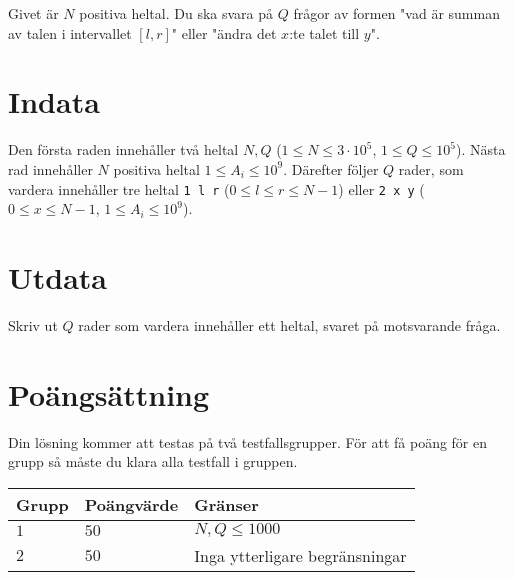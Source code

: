 Givet är $N$ positiva heltal. Du ska svara på $Q$ frågor av formen "vad är summan av talen i intervallet $[l,r]$" eller "ändra det $x$:te talet till $y$".

\section*{Indata}
Den första raden innehåller två heltal $N, Q$ ($1 \leq N \leq 3 \cdot 10^5$, $1 \leq Q \leq 10^5$).
Nästa rad innehåller $N$ positiva heltal $1 \leq A_i \leq 10^9$.
Därefter följer $Q$ rader, som vardera innehåller tre heltal \texttt{1 l r} ($0 \leq l \leq r \leq N-1$) eller \texttt{2 x y} ($0 \leq x \leq N-1$, $1 \leq A_i \leq 10^9$).

\section*{Utdata}
Skriv ut $Q$ rader som vardera innehåller ett heltal, svaret på motsvarande fråga.

\section*{Poängsättning}
Din lösning kommer att testas på två testfallsgrupper.
\noindent
För att få poäng för en grupp så måste du klara alla testfall i gruppen.

\noindent
\begin{tabular}{| l | l | l |}
\hline
  Grupp & Poängvärde & Gränser \\ \hline
  $1$    & $50$       &  $N,Q \leq 1000$ \\ \hline
  $2$    & $50$       &  Inga ytterligare begränsningar \\ \hline
\end{tabular}
